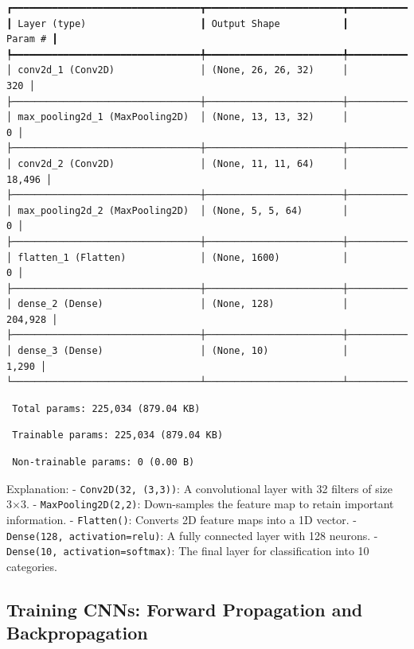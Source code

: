 \documentclass[
  letterpaper,
  DIV=11,
  numbers=noendperiod]{scrreprt}
\begin{document}
\begin{verbatim}
┏━━━━━━━━━━━━━━━━━━━━━━━━━━━━━━━━━┳━━━━━━━━━━━━━━━━━━━━━━━━┳━━━━━━━━━━━━━━━┓
┃ Layer (type)                    ┃ Output Shape           ┃       Param # ┃
┡━━━━━━━━━━━━━━━━━━━━━━━━━━━━━━━━━╇━━━━━━━━━━━━━━━━━━━━━━━━╇━━━━━━━━━━━━━━━┩
│ conv2d_1 (Conv2D)               │ (None, 26, 26, 32)     │           320 │
├─────────────────────────────────┼────────────────────────┼───────────────┤
│ max_pooling2d_1 (MaxPooling2D)  │ (None, 13, 13, 32)     │             0 │
├─────────────────────────────────┼────────────────────────┼───────────────┤
│ conv2d_2 (Conv2D)               │ (None, 11, 11, 64)     │        18,496 │
├─────────────────────────────────┼────────────────────────┼───────────────┤
│ max_pooling2d_2 (MaxPooling2D)  │ (None, 5, 5, 64)       │             0 │
├─────────────────────────────────┼────────────────────────┼───────────────┤
│ flatten_1 (Flatten)             │ (None, 1600)           │             0 │
├─────────────────────────────────┼────────────────────────┼───────────────┤
│ dense_2 (Dense)                 │ (None, 128)            │       204,928 │
├─────────────────────────────────┼────────────────────────┼───────────────┤
│ dense_3 (Dense)                 │ (None, 10)             │         1,290 │
└─────────────────────────────────┴────────────────────────┴───────────────┘
\end{verbatim}

\begin{verbatim}
 Total params: 225,034 (879.04 KB)
\end{verbatim}

\begin{verbatim}
 Trainable params: 225,034 (879.04 KB)
\end{verbatim}

\begin{verbatim}
 Non-trainable params: 0 (0.00 B)
\end{verbatim}

Explanation: - \texttt{Conv2D(32,\ (3,3))}: A convolutional layer with
32 filters of size 3×3. - \texttt{MaxPooling2D(2,2)}: Down-samples the
feature map to retain important information. - \texttt{Flatten()}:
Converts 2D feature maps into a 1D vector. -
\texttt{Dense(128,\ activation=\textquotesingle{}relu\textquotesingle{})}:
A fully connected layer with 128 neurons. -
\texttt{Dense(10,\ activation=\textquotesingle{}softmax\textquotesingle{})}:
The final layer for classification into 10 categories.

\subsection{Training CNNs: Forward Propagation and
Backpropagation}\label{training-cnns-forward-propagation-and-backpropagation}
\end{document}
